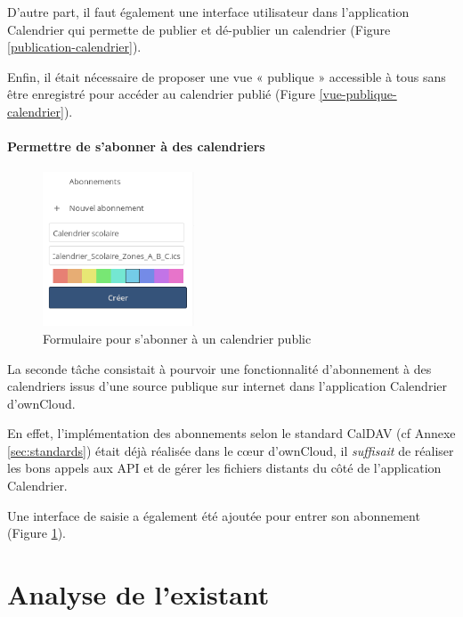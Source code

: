 \documentclass[10pt,a4paper, twoside]{report}
\begin{document}
	D'autre part, il faut également une interface utilisateur dans l'application Calendrier qui permette de publier et dé-publier un calendrier (Figure \ref{publication-calendrier}). 
	
	Enfin, il était nécessaire de proposer une vue « publique » accessible à tous sans être enregistré pour accéder au calendrier publié (Figure \ref{vue-publique-calendrier}).
	\\
	
	\subsubsection{Permettre de s'abonner à des calendriers}
	
	\begin{figure}
		\begin{center}
			\includegraphics[width=0.40\textwidth]{images/creation_abonnement.png}
		\end{center}
		\caption{Formulaire pour s'abonner à un calendrier public}
		\label{abonnement-calendrier}
	\end{figure}
	
	La seconde tâche consistait à pourvoir une fonctionnalité d'abonnement à des calendriers issus d'une source publique sur internet dans l'application Calendrier d'ownCloud. 
	
	En effet, l'implémentation des abonnements selon le standard CalDAV (cf Annexe \ref{sec:standards}) était déjà réalisée dans le cœur d'ownCloud, il \textit{suffisait} de réaliser les bons appels aux API et de gérer les fichiers distants du côté de l'application Calendrier.
	
	Une interface de saisie a également été	ajoutée pour entrer son abonnement (Figure \ref{abonnement-calendrier}).
	
	\chapter{Analyse de l'existant}
	
\end{document}

